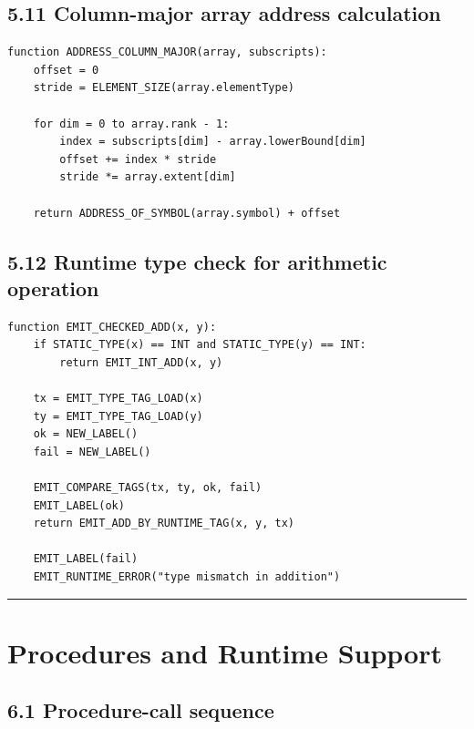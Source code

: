 \documentclass[10pt,letterpaper]{article}
\begin{document}
\subsection*{5.11 Column-major array address calculation}

\begin{verbatim}
function ADDRESS_COLUMN_MAJOR(array, subscripts):
    offset = 0
    stride = ELEMENT_SIZE(array.elementType)

    for dim = 0 to array.rank - 1:
        index = subscripts[dim] - array.lowerBound[dim]
        offset += index * stride
        stride *= array.extent[dim]

    return ADDRESS_OF_SYMBOL(array.symbol) + offset
\end{verbatim}

\subsection*{5.12 Runtime type check for arithmetic operation}

\begin{verbatim}
function EMIT_CHECKED_ADD(x, y):
    if STATIC_TYPE(x) == INT and STATIC_TYPE(y) == INT:
        return EMIT_INT_ADD(x, y)

    tx = EMIT_TYPE_TAG_LOAD(x)
    ty = EMIT_TYPE_TAG_LOAD(y)
    ok = NEW_LABEL()
    fail = NEW_LABEL()

    EMIT_COMPARE_TAGS(tx, ty, ok, fail)
    EMIT_LABEL(ok)
    return EMIT_ADD_BY_RUNTIME_TAG(x, y, tx)

    EMIT_LABEL(fail)
    EMIT_RUNTIME_ERROR("type mismatch in addition")
\end{verbatim}

\medskip\hrule\medskip

\clearpage
\section{Procedures and Runtime Support}

\subsection*{6.1 Procedure-call sequence}
\end{document}
